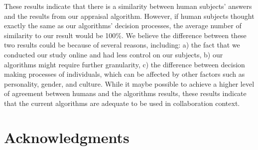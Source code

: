 \documentclass{aamas2016}
\begin{document}
These results indicate that there is a similarity between human subjects'
answers and the results from our appraisal algorithm. However, if human subjects
thought exactly the same as our algorithms' decision processes, the average
number of similarity to our result would be 100\%. We believe the difference between
these two results could be because of several reasons, including: a) the fact
that we conducted our study online and had less control on our subjects, b) our
algorithms might require further granularity, c) the difference between decision
making processes of individuals, which can be affected by other factors such as
personality, gender, and culture. While it maybe possible to achieve a higher
level of agreement between humans and the algorithms results, these results
indicate that the current algorithms are adequate to be used in collaboration
context.




\section*{Acknowledgments}

%
%
%

%
\end{document}
